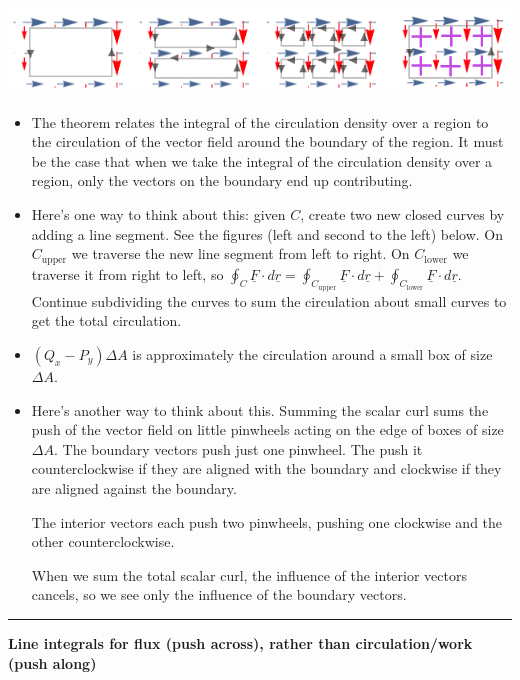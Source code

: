 \documentclass[12pt,letterpaper,noanswers]{exam}
\newcommand{\mb}[1]{\underline{#1}}
\begin{document}
\begin{center}
\includegraphics[width=\linewidth]{img/C28p3-18.png}
\end{center}

\begin{itemize}
\item The theorem relates the integral of the circulation density over a region to the circulation of the vector field around the boundary of the region. It must be the case that when we take the integral of the circulation density over a region, only the vectors on the boundary end up contributing.
\item Here's one way to think about this: given $C$, create two new closed curves by adding a line segment.  See the figures (left and second to the left) below.  On $C_{\text{upper}}$ we traverse the new line segment from left to right. On $C_{\text{lower}}$ we traverse it from right to left, so $\oint_C \mb F \cdot d\mb r = \oint_{C_{\text{upper}}}\mb F\cdot d\mb r + \oint_{C_{\text{lower}}}\mb F\cdot d\mb r$.  Continue subdividing the curves to sum the circulation about small curves to get the total circulation.
\item $(Q_x-P_y)\Delta A$ is approximately the circulation around a small box of size $\Delta A$. 
\item Here's another way to think about this.  Summing the scalar curl sums the push of the vector field on little pinwheels acting on the edge of boxes of size $\Delta A$.  The boundary vectors push just one pinwheel.  The push it counterclockwise if they are aligned with the boundary and clockwise if they are aligned against the boundary.

The interior vectors each push two pinwheels, pushing one clockwise and the other counterclockwise.

When we sum the total scalar curl, the influence of the interior vectors cancels, so we see only the influence of the boundary vectors.
\end{itemize}

\vspace{0.2cm}
\hrule
\vspace{0.2cm}




\noindent\textbf{Line integrals for flux (push across), rather than circulation/work (push along)}
\end{document}

